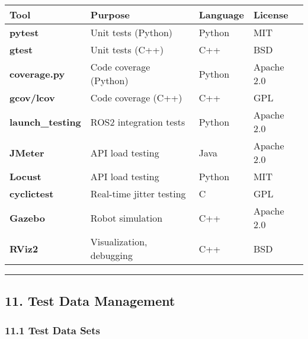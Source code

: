 \documentclass[
]{article}
\begin{document}
\begin{longtable}[]{@{}llll@{}}
\toprule\noalign{}
\textbf{Tool} & \textbf{Purpose} & \textbf{Language} &
\textbf{License} \\
\midrule\noalign{}
\endhead
\bottomrule\noalign{}
\endlastfoot
\textbf{pytest} & Unit tests (Python) & Python & MIT \\
\textbf{gtest} & Unit tests (C++) & C++ & BSD \\
\textbf{coverage.py} & Code coverage (Python) & Python & Apache 2.0 \\
\textbf{gcov/lcov} & Code coverage (C++) & C++ & GPL \\
\textbf{launch\_testing} & ROS2 integration tests & Python & Apache
2.0 \\
\textbf{JMeter} & API load testing & Java & Apache 2.0 \\
\textbf{Locust} & API load testing & Python & MIT \\
\textbf{cyclictest} & Real-time jitter testing & C & GPL \\
\textbf{Gazebo} & Robot simulation & C++ & Apache 2.0 \\
\textbf{RViz2} & Visualization, debugging & C++ & BSD \\
\end{longtable}

\begin{center}\rule{0.5\linewidth}{0.5pt}\end{center}

\hypertarget{test-data-management}{%
\subsection{11. Test Data Management}\label{test-data-management}}

\hypertarget{test-data-sets}{%
\subsubsection{11.1 Test Data Sets}\label{test-data-sets}}
\end{document}
